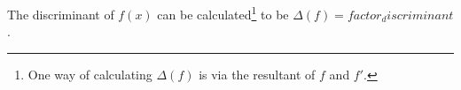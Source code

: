 The discriminant of $f(x)$ can be calculated\footnote{One way of calculating $\Delta(f)$ is via the resultant of $f$ and $f'$.} to be $\Delta(f)={factor_discriminant}$.